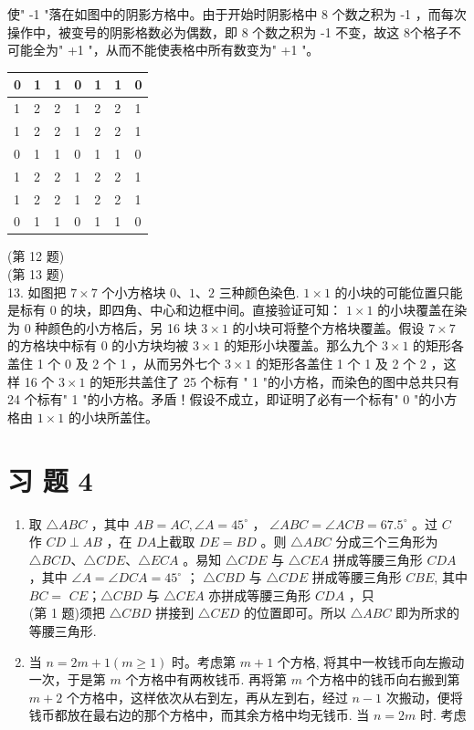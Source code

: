\documentclass[10pt]{article}
\begin{document}
使" -1 "落在如图中的阴影方格中。由于开始时阴影格中 8 个数之积为 -1 ，而每次操作中，被变号的阴影格数必为偶数，即 8 个数之积为 -1 不变，故这 8个格子不可能全为" +1 "，从而不能使表格中所有数变为" +1 "。

\begin{center}
\begin{tabular}{|l|l|l|l|l|l|l|}
\hline
0 & 1 & 1 & 0 & 1 & 1 & 0 \\
\hline
1 & 2 & 2 & 1 & 2 & 2 & 1 \\
\hline
1 & 2 & 2 & 1 & 2 & 2 & 1 \\
\hline
0 & 1 & 1 & 0 & 1 & 1 & 0 \\
\hline
1 & 2 & 2 & 1 & 2 & 2 & 1 \\
\hline
1 & 2 & 2 & 1 & 2 & 2 & 1 \\
\hline
0 & 1 & 1 & 0 & 1 & 1 & 0 \\
\hline
\end{tabular}
\end{center}

(第 12 题)\\
(第 13 题)\\
13. 如图把 $7 \times 7$ 个小方格块 $0 、 1 、 2$ 三种颜色染色. $1 \times 1$ 的小块的可能位置只能是标有 0 的块，即四角、中心和边框中间。直接验证可知： $1 \times 1$ 的小块覆盖在染为 0 种颜色的小方格后，另 16 块 $3 \times 1$ 的小块可将整个方格块覆盖。假设 $7 \times 7$ 的方格块中标有 0 的小方块均被 $3 \times 1$ 的矩形小块覆盖。那么九个 $3 \times 1$ 的矩形各盖住 1 个 0 及 2 个 1 ，从而另外七个 $3 \times 1$ 的矩形各盖住 1 个 1 及 2 个 2 ，这样 16 个 $3 \times 1$ 的矩形共盖住了 25 个标有 " 1 "的小方格，而染色的图中总共只有 24 个标有" 1 "的小方格。矛盾！假设不成立，即证明了必有一个标有" 0 "的小方格由 $1 \times 1$ 的小块所盖住。

\section{习 题 4}
\begin{enumerate}
  \item 取 $\triangle A B C$ ，其中 $A B=A C, \angle A=45^{\circ}$ ， $\angle A B C=\angle A C B=67.5^{\circ}$ 。过 $C$ 作 $C D \perp A B$ ，在 $D A$上截取 $D E=B D$ 。则 $\triangle A B C$ 分成三个三角形为 $\triangle B C D 、 \triangle C D E 、 \triangle E C A$ 。易知 $\triangle C D E$ 与 $\triangle C E A$ 拼成等腰三角形 $C D A$ ，其中 $\angle A=\angle D C A=45^{\circ}$ ； $\triangle C B D$ 与 $\triangle C D E$ 拼成等腰三角形 $C B E$, 其中 $B C=$ $C E ； \triangle C B D$ 与 $\triangle C E A$ 亦拼成等腰三角形 $C D A$ ，只\\
(第 1 题)须把 $\triangle C B D$ 拼接到 $\triangle C E D$ 的位置即可。所以 $\triangle A B C$ 即为所求的等腰三角形.
  \item 当 $n=2 m+1(m \geqslant 1)$ 时。考虑第 $m+1$ 个方格, 将其中一枚钱币向左搬动一次，于是第 $m$ 个方格中有两枚钱币. 再将第 $m$ 个方格中的钱币向右搬到第 $m+2$ 个方格中，这样依次从右到左，再从左到右，经过 $n-1$ 次搬动，便将钱币都放在最右边的那个方格中，而其余方格中均无钱币. 当 $n=2 m$ 时. 考虑
\end{enumerate}
\end{document}
